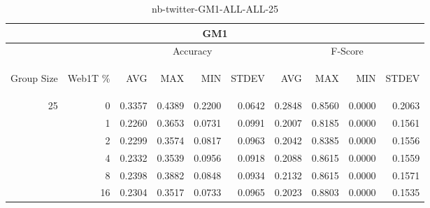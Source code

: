 \begin{center}
\begin{table}[htbp]
\begin{tabular}{ | r | r | r | r | r | r | r | r | r | r |}
\hline
\multicolumn{10}{|c|}{GM1}\\
\hline
 & & \multicolumn{4}{|c|}{Accuracy} & \multicolumn{4}{|c|}{F-Score}\\ \cline{3-10}
\begin{sideways}Group Size\end{sideways} & \begin{sideways}Web1T \%\end{sideways} & \begin{sideways}AVG\end{sideways} & \begin{sideways}MAX\end{sideways} & \begin{sideways}MIN\end{sideways} & \begin{sideways}STDEV\end{sideways} & \begin{sideways}AVG\end{sideways} & \begin{sideways}MAX\end{sideways} & \begin{sideways}MIN\end{sideways} & \begin{sideways}STDEV\end{sideways}\\
\hline
\multirow{5}{*}{25}
 & 0 & 0.3357 & 0.4389 & 0.2200 & 0.0642 & 0.2848 & 0.8560 & 0.0000 & 0.2063\\ \cline{2-10}
 & 1 & 0.2260 & 0.3653 & 0.0731 & 0.0991 & 0.2007 & 0.8185 & 0.0000 & 0.1561\\ \cline{2-10}
 & 2 & 0.2299 & 0.3574 & 0.0817 & 0.0963 & 0.2042 & 0.8385 & 0.0000 & 0.1556\\ \cline{2-10}
 & 4 & 0.2332 & 0.3539 & 0.0956 & 0.0918 & 0.2088 & 0.8615 & 0.0000 & 0.1559\\ \cline{2-10}
 & 8 & 0.2398 & 0.3882 & 0.0848 & 0.0934 & 0.2132 & 0.8615 & 0.0000 & 0.1571\\ \cline{2-10}
 & 16 & 0.2304 & 0.3517 & 0.0733 & 0.0965 & 0.2023 & 0.8803 & 0.0000 & 0.1535\\ \cline{2-10}
\hline
\end{tabular}
\caption{nb-twitter-GM1-ALL-ALL-25}
\label{table:nb-twitter-GM1-ALL-ALL-25}
\end{table}
\end{center}

